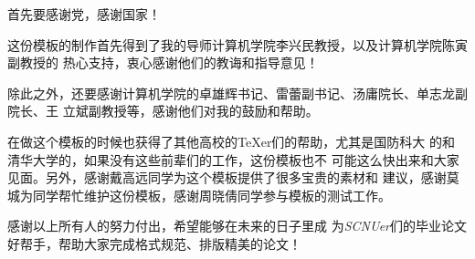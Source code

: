 ﻿

\begin{ack}

  首先要感谢党，感谢国家！
  
  这份模板的制作首先得到了我的导师计算机学院李兴民教授，以及计算机学院陈寅副教授的
  热心支持，衷心感谢他们的教诲和指导意见！

  除此之外，还要感谢计算机学院的卓雄辉书记、雷蕾副书记、汤庸院长、单志龙副院长、王
  立斌副教授等，感谢他们对我的鼓励和帮助。

  在做这个模板的时候也获得了其他高校的\TeX{}er们的帮助，尤其是国防科大
  的\nudtpaper{}和清华大学的\thuthesis{}，如果没有这些前辈们的工作，这份模板也不
  可能这么快出来和大家见面。另外，感谢戴高远同学为这个模板提供了很多宝贵的素材和
  建议，感谢莫城为同学帮忙维护这份模板，感谢周晓倩同学参与模板的测试工作。

  感谢以上所有人的努力付出，希望\scnuthesis{}能够在未来的日子里成
  为\textit{SCNUer}们的毕业论文好帮手，帮助大家完成格式规范、排版精美的论文！

\end{ack}
